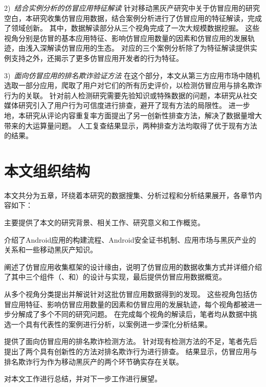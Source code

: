 2)\ \emph{结合实例分析的仿冒应用特征解读} \quad
针对移动黑灰产研究中关于仿冒应用的研究空白，本研究收集仿冒应用数据，结合案例分析进行了仿冒应用的特征解读，完成了领域创新。
其中，数据解读部分从三个视角完成了一次大规模数据挖掘。
这些视角分别是仿冒的基本应用特征、影响仿冒应用数量的因素和仿冒应用的发展轨迹，由浅入深解读仿冒应用的生态。
对应的三个案例分析除了为特征解读提供实例支持之外，还揭示了更多仿冒应用开发者的行为特征。

3)\ \emph{面向仿冒应用的排名欺诈验证方法} \quad
在这个部分，本文从第三方应用市场中随机选取一部分应用，爬取了用户对它们的所有历史评价，以检测仿冒应用与排名欺诈行为的关联。
针对前人检测研究需要先验知识或特殊数据的问题，本研究从社交媒体研究引入了用户行为可信度进行排查，避开了现有方法的局限性。
进一步地，本研究从评论内容重复率方面提出了另一创新性排查方法，解决了数据量增大带来的大运算量问题。
人工复查结果显示，两种排查方法均取得了优于现有方法的结果。


\section{本文组织结构}
本文共分为五章，环绕着本研究的数据搜集、分析过程和分析结果展开，各章节内容如下：

 主要提供了本文的研究背景、相关工作、研究意义和工作概览。

 介绍了Android应用的构建流程、Android安全证书机制、应用市场与黑灰产业的关系和一些移动黑灰产知识。

 阐述了仿冒应用收集框架\mytool 的设计缘由，说明了仿冒应用的数据收集方式并详细介绍了其中三个组件（\componentA、\componentB 和\componentC）的设计与实现，最后提供仿冒应用数据概览。

 从多个视角分类提出并解说针对这批仿冒应用数据得到的发现。
这些视角包括仿冒应用特征、影响仿冒应用数量的因素和仿冒应用的发展轨迹，每个视角都被进一步分解成了多个不同的研究问题。
在完成每个视角的解读后，笔者均从数据中挑选一个具有代表性的案例进行分析，以案例进一步深化分析结果。

 提供了面向仿冒应用的排名欺诈检测方法。
针对现有检测方法的不足，笔者先后提出了两个具有创新性的方法对排名欺诈行为进行排查。
结果显示，仿冒应用与排名欺诈行为作为移动黑灰产的两个环节确实存在关联。

 对本文工作进行总结，并对下一步工作进行展望。
